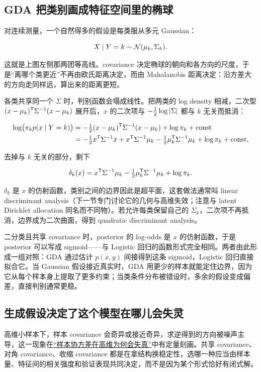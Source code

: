 \subsection{GDA 把类别画成特征空间里的椭球}

对连续测量，一个自然得多的假设是每类服从多元 Gaussian：

\[
X\mid Y=k\sim\mathcal N(\mu_k,\Sigma_k).
\]

这就是上图左侧那两团等高线。covariance 决定椭球的朝向和各方向的尺度，于是``离哪个类更近''不再由欧氏距离决定，而由 Mahalanobis 距离决定：沿方差大的方向走同样远，算出来的距离更短。

各类共享同一个 \(\Sigma\) 时，判别函数会塌成线性。把两类的 log density 相减，二次型 \((x-\mu_k)^{\mathsf{T}}\Sigma^{-1}(x-\mu_k)\) 展开后，\(x\) 的二次项与 \(-\tfrac12\log\left|\Sigma\right|\) 都与 \(k\) 无关而抵消：

\[
\begin{aligned}
\log\bigl(\pi_kp(x\mid Y=k)\bigr)
&=-\tfrac12(x-\mu_k)^{\mathsf{T}}\Sigma^{-1}(x-\mu_k)
+\log\pi_k+\text{const}\\
&=-\tfrac12x^{\mathsf{T}}\Sigma^{-1}x
+x^{\mathsf{T}}\Sigma^{-1}\mu_k
-\tfrac12\mu_k^{\mathsf{T}}\Sigma^{-1}\mu_k
+\log\pi_k+\text{const},
\end{aligned}
\]

去掉与 \(k\) 无关的部分，剩下

\[
\delta_k(x)
=x^{\mathsf{T}}\Sigma^{-1}\mu_k
-\tfrac12\mu_k^{\mathsf{T}}\Sigma^{-1}\mu_k
+\log\pi_k.
\]

\(\delta_k\) 是 \(x\) 的仿射函数，类别之间的边界因此是超平面，这套做法通常叫 linear discriminant analysis（下一节专门讨论它的几何与高维失效；注意与 latent Dirichlet allocation 同名而不同物）。若允许每类保留自己的 \(\Sigma_k\)，二次项不再抵消，边界成为二次曲面，得到 quadratic discriminant analysis。

二分类且共享 covariance 时，posterior 的 log-odds 是 \(x\) 的仿射函数，于是 posterior 可以写成 sigmoid——与 Logistic 回归的函数形式完全相同。两者由此形成一组对照：GDA 通过估计 \(p(x,y)\) 间接得到这条 sigmoid，Logistic 回归直接拟合它。当 Gaussian 假设接近真实时，GDA 用更少的样本就能定住边界，因为它从每个样本身上提取了更多约束；当类条件分布被错设时，多余的假设变成偏差，直接判别通常更稳。

\subsection{生成假设决定了这个模型在哪儿会失灵}

高维小样本下，样本 covariance 会奇异或接近奇异，求逆得到的方向被噪声主导，这一现象在\hyperref[sec:11-Mathematical-Statistics/09-Random-Matrix-Theory/01]{``样本协方差在高维为何会失真''}中有定量刻画。共享 covariance、对角 covariance、收缩 covariance 都是在拿结构换稳定性，选哪一种应当由样本量、特征间的相关强度和验证表现共同决定，而不是因为某个形式恰好有闭式解。

